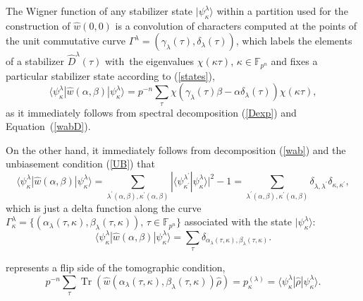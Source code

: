 \documentclass[quantumrep,article,accept,pdftex,moreauthors]{Definitions/mdpi}
\DeclareMathOperator{\Tr}{Tr}
\begin{document}
The Wigner function of any stabilizer state $|\psi_{\kappa}^{\lambda}\rangle$
within a partition used for the construction of $\hat{w}\left(0,0\right)$ is a
convolution of characters computed at the points of the unit commutative curve
$\Gamma^{\lambda}=\left(\gamma_{\lambda}\left(\tau\right),\delta_{\lambda}(\tau)\right)
$, which labels the elements of a stabilizer $\hat{D}^{\lambda}(\tau)$ with~the
eigenvalues $\chi(\kappa\tau)$, $\kappa \in \mathbb F_{p^{n}}$ and fixes a
particular stabilizer state according to (\ref{states}),
\begin{equation}
  \langle \psi_{\kappa}^{\lambda}|\hat{w}\left( \alpha,\beta \right)
  |\psi_{\kappa}^{\lambda}\rangle
  = p^{-n}
  \sum_{\tau }\chi \left(
    \gamma_{\lambda}(\tau)\beta-\alpha \delta_{\lambda}(\tau)
  \right) \chi(\kappa\tau),
  \label{T1}
\end{equation}
as it immediately follows from  spectral decomposition  (\ref{Dexp}) and
Equation~(\ref{wabD}).

On the other hand, it immediately follows from  decomposition (\ref{wab}) and
the unbiasement condition (\ref{UB}) that
\begin{equation}
  \langle \psi_{\kappa }^{\lambda}|\hat{w}\left( \alpha,\beta \right)
  |\psi_{\kappa}^{\lambda}\rangle
  = \sum_{\lambda^{\prime}(\alpha,\beta),\kappa^{\prime }(\alpha,\beta)}
  |\langle
    \psi_{\kappa^{\prime}}^{\lambda^{\prime }}|\psi_{\kappa}^{\lambda}
  \rangle|^{2}-1
  = \sum_{\lambda^{\prime}(\alpha,\beta),\kappa^{\prime}(\alpha,\beta)}
  \delta_{\lambda,\lambda^{\prime}}\delta_{\kappa,\kappa^{\prime}},
\end{equation}
which is just a delta function along the curve $\Gamma_{\kappa}^{\lambda} =
\{(\alpha_{\lambda}(\tau,\kappa),\beta_{\lambda}(\tau,\kappa)),\,\tau \in
\mathbb F_{p^{n}}\}$ associated with the state $|\psi_{\kappa
}^{\lambda}\rangle$:
\begin{equation}
  \langle \psi_{\kappa}^{\lambda}
  |\hat{w}\left( \alpha,\beta \right)
  |\psi_{\kappa }^{\lambda}
  \rangle = \sum_{\tau} \delta_{\alpha_{\lambda}(\tau,\kappa),
  \beta_{\lambda}(\tau ,\kappa )}.
  \label{T2}
\end{equation}

 represents a flip side of the tomographic condition,
\begin{equation}
  p^{-n}
  \sum_{\tau} \Tr\left(
    \hat{w}\left(
      \alpha_{\lambda}(\tau,\kappa),\beta_{\lambda}(\tau,\kappa)
    \right) \hat{\rho}
  \right)
  = p_{\kappa}^{(\lambda)}
  = \langle \psi_{\kappa}^{\lambda} |\hat{\rho}|\psi_{\kappa}^{\lambda}\rangle.
  \label{T3}
\end{equation}
\end{document}
